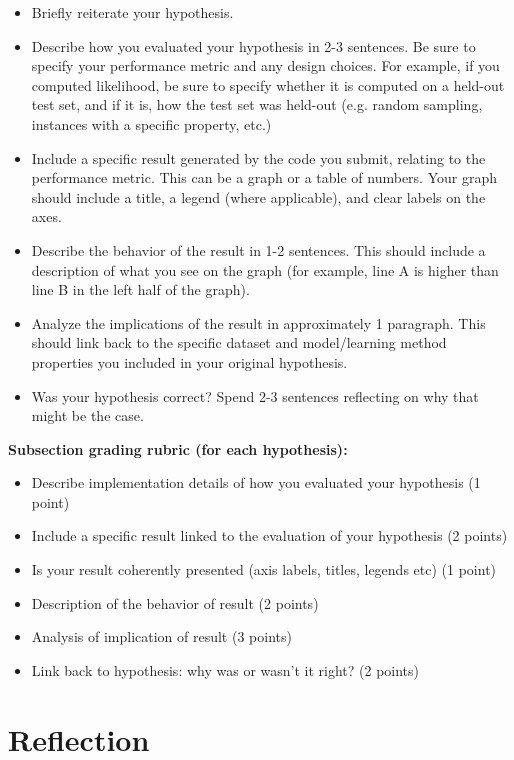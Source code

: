 \documentclass[12pt]{article}
\begin{document}
\begin{itemize}
 \item Briefly reiterate your hypothesis.  
 \item Describe how you evaluated your hypothesis in 2-3 sentences.  Be sure to specify your performance metric and any design choices.  For example, if you computed likelihood, be sure to specify whether it is computed on a held-out test set, and if it is, how the test set was held-out (e.g. random sampling, instances with a specific property, etc.)
 \item Include a specific result generated by the code you submit, relating to the performance metric.  This can be a graph or a table of numbers.  Your graph should include a title, a legend (where applicable), and clear labels on the axes.   
 \item Describe the behavior of the result in 1-2 sentences.  This should include a description of what you see on the graph (for example, line A is higher than line B in the left half of the graph).
 \item Analyze the implications of the result in approximately 1 paragraph.  This should link back to the specific dataset and model/learning method properties you included in your original hypothesis.  
 \item Was your hypothesis correct?  Spend 2-3 sentences reflecting on why that might be the case.
\end{itemize}

\textbf{Subsection grading rubric (for each hypothesis):}
\begin{itemize}
	\item Describe implementation details of how you evaluated your hypothesis (1 point)
	\item Include a specific result linked to the evaluation of your hypothesis (2 points)
	\item Is your result coherently presented (axis labels, titles, legends etc) (1 point)
	\item Description of the behavior of result (2 points)
	\item Analysis of implication of result (3 points)
	\item Link back to hypothesis: why was or wasn't it right? (2 points)
\end{itemize}

\section{Reflection}
\end{document}
